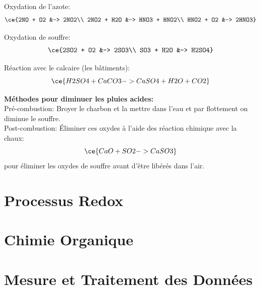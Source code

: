 \documentclass[french, a4paper, 12pt]{article}
\begin{document}
Oxydation de l'azote:
\begin{align*}
\ce{2NO + O2 &-> 2NO2\\
2NO2 + H2O &-> HNO3 + HNO2\\
HNO2 + O2 &-> 2HNO3}
\end{align*}

Oxydation de souffre:
\begin{align*}
\ce{2SO2 + O2 &-> 2SO3\\
SO3 + H2O &-> H2SO4}
\end{align*}

Réaction avec le calcaire (les bâtiments):
\[
\ce{H2SO4 + CaCO3 -> CaSO4 + H2O + CO2}
\]

\vspace{0.5em}
\textbf{Méthodes pour diminuer les pluies acides:}\\
Pré-combustion: Broyer le charbon et la mettre dans l'eau et par flottement on diminue le souffre.\\
Post-combustion: Éliminer ces oxydes à l'aide des réaction chimique avec la chaux:
\[
\ce{CaO + SO2 -> CaSO3}
\]
pour éliminer les oxydes de souffre avant d'être libérés dans l'air.
\pagebreak

\section{Processus Redox}
\pagebreak

\section{Chimie Organique}
\pagebreak

\section{Mesure et Traitement des Données}
\pagebreak
\end{document}
